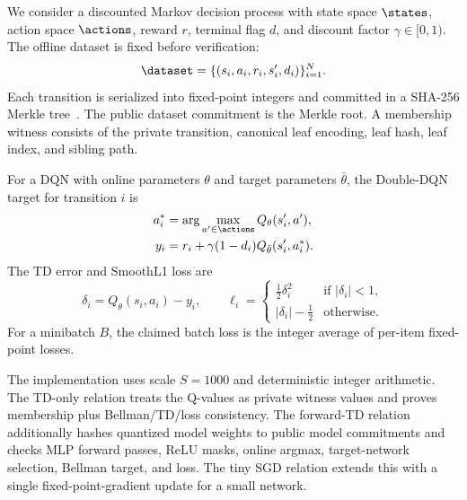 We consider a discounted Markov decision process with state space $\states$,
action space $\actions$, reward $r$, terminal flag $d$, and discount factor
$\gamma \in [0,1)$. The offline dataset is fixed before verification:
\[
\dataset = \{(s_i,a_i,r_i,s'_i,d_i)\}_{i=1}^N .
\]
Each transition is serialized into fixed-point integers and committed in a
SHA-256 Merkle tree~\cite{merkle1987}. The public dataset commitment is the
Merkle root. A membership witness consists of the private transition, canonical
leaf encoding, leaf hash, leaf index, and sibling path.

For a DQN with online parameters $\theta$ and target parameters $\bar{\theta}$,
the Double-DQN target for transition $i$ is
\begin{align}
a_i^* &= \arg\max_{a' \in \actions} Q_\theta(s'_i,a'), \\
y_i &= r_i + \gamma (1-d_i) Q_{\bar{\theta}}(s'_i,a_i^*).
\end{align}
The TD error and SmoothL1 loss are
\[
\delta_i = Q_\theta(s_i,a_i) - y_i,
\qquad
\ell_i =
\begin{cases}
\frac{1}{2}\delta_i^2 & \text{if } |\delta_i| < 1,\\
|\delta_i|-\frac{1}{2} & \text{otherwise.}
\end{cases}
\]
For a minibatch $B$, the claimed batch loss is the integer average of per-item
fixed-point losses.

The implementation uses scale $S=1000$ and deterministic integer arithmetic.
The TD-only relation treats the Q-values as private witness values and proves
membership plus Bellman/TD/loss consistency. The forward-TD relation additionally
hashes quantized model weights to public model commitments and checks MLP
forward passes, ReLU masks, online argmax, target-network selection, Bellman
target, and loss. The tiny SGD relation extends this with a single
fixed-point-gradient update for a small network.
